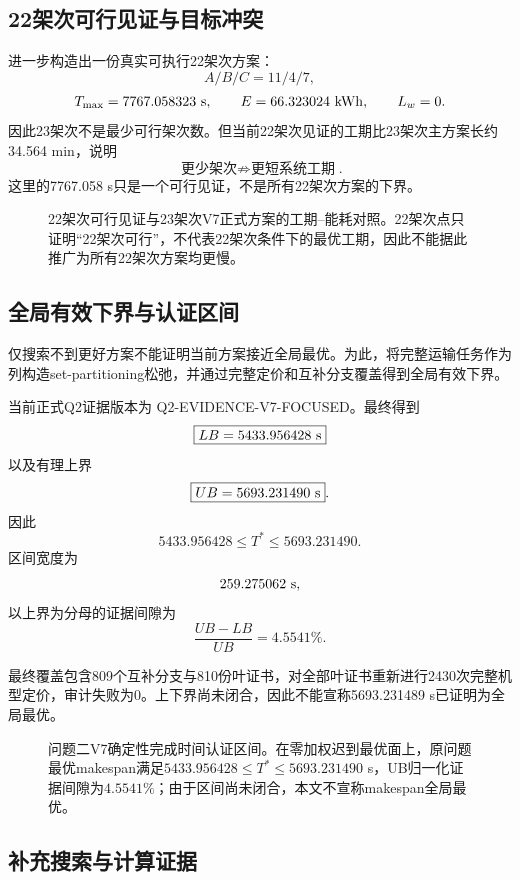\documentclass[UTF8,a4paper,12pt]{ctexart}
\begin{document}
\subsection{22架次可行见证与目标冲突}

进一步构造出一份真实可执行22架次方案：
\[
A/B/C=11/4/7,
\]
\[
T_{\max}=7767.058323\ {\rm s},
\qquad
E=66.323024\ {\rm kWh},
\qquad
L_w=0.
\]
因此23架次不是最少可行架次数。但当前22架次见证的工期比23架次主方案长约34.564 min，说明
\[
\boxed{
\text{更少架次}
\not\Rightarrow
\text{更短系统工期}
}.
\]
这里的7767.058 s只是一个可行见证，不是所有22架次方案的下界。

\begin{figure}[H]
  \centering
  \resizebox{0.78\textwidth}{!}{\QTwoFigTwentyTwoTwentyThree}
  \caption{22架次可行见证与23架次V7正式方案的工期--能耗对照。22架次点只证明“22架次可行”，不代表22架次条件下的最优工期，因此不能据此推广为所有22架次方案均更慢。}
  \label{fig:q2_22_23_v7}
\end{figure}

\subsection{全局有效下界与认证区间}

仅搜索不到更好方案不能证明当前方案接近全局最优。为此，将完整运输任务作为列构造set-partitioning松弛，并通过完整定价和互补分支覆盖得到全局有效下界。

当前正式Q2证据版本为 Q2-EVIDENCE-V7-FOCUSED。最终得到
\[
\boxed{
LB=5433.956428\ {\rm s}
}
\]
以及有理上界
\[
\boxed{
UB=5693.231490\ {\rm s}
}.
\]
因此
\[
\boxed{
5433.956428\le T^*\le5693.231490
}.
\]
区间宽度为
\[
259.275062\ {\rm s},
\]
以上界为分母的证据间隙为
\[
\boxed{
\frac{UB-LB}{UB}=4.5541\%
}.
\]

最终覆盖包含809个互补分支与810份叶证书，对全部叶证书重新进行2430次完整机型定价，审计失败为0。上下界尚未闭合，因此不能宣称5693.231489 s已证明为全局最优。

\begin{figure}[H]
  \centering
  \resizebox{0.80\textwidth}{!}{\QTwoFigInterval}
  \caption{问题二V7确定性完成时间认证区间。在零加权迟到最优面上，原问题最优makespan满足$5433.956428\le T^*\le5693.231490$ s，UB归一化证据间隙为$4.5541\%$；由于区间尚未闭合，本文不宣称makespan全局最优。}
  \label{fig:q2_interval_v7}
\end{figure}

\subsection{补充搜索与计算证据}
\end{document}
